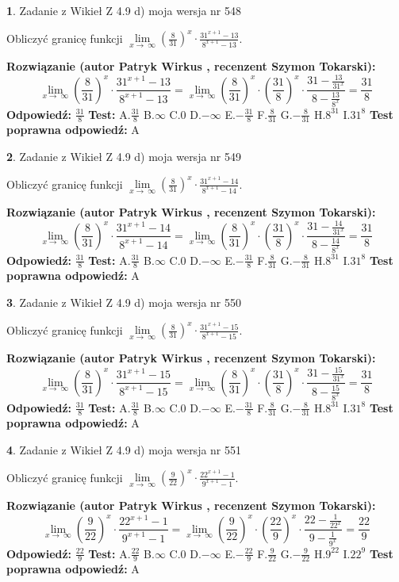 \documentclass[12pt, a4paper]{article}
\theoremstyle{definition} %
\newtheorem{zad}{}
\newcommand{\zadStart}[1]{\begin{zad}#1\newline}
\newcommand{\zadStop}{\end{zad}}
\newcommand{\rozwStart}[2]{\noindent \textbf{Rozwiązanie (autor #1 , recenzent #2): }\newline}
\newcommand{\rozwStop}{\newline}
\newcommand{\odpStart}{\noindent \textbf{Odpowiedź:}\newline}
\newcommand{\odpStop}{\newline}
\newcommand{\testStart}{\noindent \textbf{Test:}\newline}
\newcommand{\testStop}{\newline}
\newcommand{\kluczStart}{\noindent \textbf{Test poprawna odpowiedź:}\newline}
\newcommand{\kluczStop}{\newline}
\begin{document}
\zadStart{Zadanie z Wikieł Z 4.9 d) moja wersja nr 548}


Obliczyć granicę funkcji  $\lim\limits_{x\to\ \infty}(\frac{8}{31})^{x}\cdot\frac{31^{x+1}-13}{8^{x+1}-13}$.
\zadStop
\rozwStart{Patryk Wirkus}{Szymon Tokarski}
$$\lim\limits_{x\to\ \infty}(\frac{8}{31})^{x}\cdot\frac{31^{x+1}-13}{8^{x+1}-13}=\lim\limits_{x\to\ \infty}(\frac{8}{31})^{x}\cdot(\frac{31}{8})^{x} \cdot \frac{31-\frac{13}{31^{x}}}{8-\frac{13}{8^{x}}} = \frac{31}{8}$$
\rozwStop
\odpStart
$\frac{31}{8}$
\odpStop
\testStart
A.$\frac{31}{8}$ B.$\infty$ C.$0$ D.$-\infty$ E.$-\frac{31}{8}$
F.$\frac{8}{31}$ G.$-\frac{8}{31}$
H.$8^{31}$
I.$31^{8}$
\testStop
\kluczStart
A
\kluczStop



\zadStart{Zadanie z Wikieł Z 4.9 d) moja wersja nr 549}


Obliczyć granicę funkcji  $\lim\limits_{x\to\ \infty}(\frac{8}{31})^{x}\cdot\frac{31^{x+1}-14}{8^{x+1}-14}$.
\zadStop
\rozwStart{Patryk Wirkus}{Szymon Tokarski}
$$\lim\limits_{x\to\ \infty}(\frac{8}{31})^{x}\cdot\frac{31^{x+1}-14}{8^{x+1}-14}=\lim\limits_{x\to\ \infty}(\frac{8}{31})^{x}\cdot(\frac{31}{8})^{x} \cdot \frac{31-\frac{14}{31^{x}}}{8-\frac{14}{8^{x}}} = \frac{31}{8}$$
\rozwStop
\odpStart
$\frac{31}{8}$
\odpStop
\testStart
A.$\frac{31}{8}$ B.$\infty$ C.$0$ D.$-\infty$ E.$-\frac{31}{8}$
F.$\frac{8}{31}$ G.$-\frac{8}{31}$
H.$8^{31}$
I.$31^{8}$
\testStop
\kluczStart
A
\kluczStop



\zadStart{Zadanie z Wikieł Z 4.9 d) moja wersja nr 550}


Obliczyć granicę funkcji  $\lim\limits_{x\to\ \infty}(\frac{8}{31})^{x}\cdot\frac{31^{x+1}-15}{8^{x+1}-15}$.
\zadStop
\rozwStart{Patryk Wirkus}{Szymon Tokarski}
$$\lim\limits_{x\to\ \infty}(\frac{8}{31})^{x}\cdot\frac{31^{x+1}-15}{8^{x+1}-15}=\lim\limits_{x\to\ \infty}(\frac{8}{31})^{x}\cdot(\frac{31}{8})^{x} \cdot \frac{31-\frac{15}{31^{x}}}{8-\frac{15}{8^{x}}} = \frac{31}{8}$$
\rozwStop
\odpStart
$\frac{31}{8}$
\odpStop
\testStart
A.$\frac{31}{8}$ B.$\infty$ C.$0$ D.$-\infty$ E.$-\frac{31}{8}$
F.$\frac{8}{31}$ G.$-\frac{8}{31}$
H.$8^{31}$
I.$31^{8}$
\testStop
\kluczStart
A
\kluczStop



\zadStart{Zadanie z Wikieł Z 4.9 d) moja wersja nr 551}


Obliczyć granicę funkcji  $\lim\limits_{x\to\ \infty}(\frac{9}{22})^{x}\cdot\frac{22^{x+1}-1}{9^{x+1}-1}$.
\zadStop
\rozwStart{Patryk Wirkus}{Szymon Tokarski}
$$\lim\limits_{x\to\ \infty}(\frac{9}{22})^{x}\cdot\frac{22^{x+1}-1}{9^{x+1}-1}=\lim\limits_{x\to\ \infty}(\frac{9}{22})^{x}\cdot(\frac{22}{9})^{x} \cdot \frac{22-\frac{1}{22^{x}}}{9-\frac{1}{9^{x}}} = \frac{22}{9}$$
\rozwStop
\odpStart
$\frac{22}{9}$
\odpStop
\testStart
A.$\frac{22}{9}$ B.$\infty$ C.$0$ D.$-\infty$ E.$-\frac{22}{9}$
F.$\frac{9}{22}$ G.$-\frac{9}{22}$
H.$9^{22}$
I.$22^{9}$
\testStop
\kluczStart
A
\kluczStop
\end{document}
